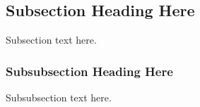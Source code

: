 \documentclass{article}
\begin{document}
\subsection{Subsection Heading Here}
Subsection text here.


\subsubsection{Subsubsection Heading Here}
Subsubsection text here.


%
%



%
%
\end{document}
